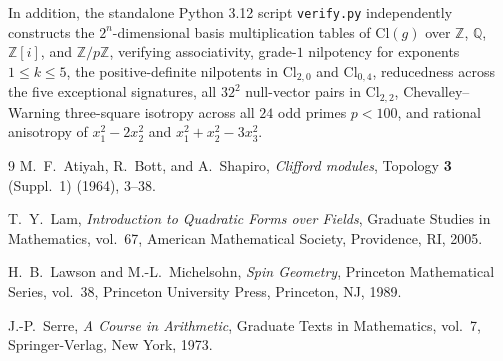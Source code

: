\documentclass[11pt]{article}
\theoremstyle{definition}
\newcommand{\Cl}{\mathrm{Cl}}
\newcommand{\Q}{\mathbb{Q}}
\newcommand{\Z}{\mathbb{Z}}
\begin{document}
In addition, the standalone Python 3.12 script \texttt{verify.py} independently constructs
the $2^n$-dimensional basis multiplication tables of $\Cl(g)$ over $\Z$, $\Q$, $\Z[i]$, and
$\Z/p\Z$, verifying associativity, grade-$1$ nilpotency for exponents $1 \le k \le 5$, the
positive-definite nilpotents in $\Cl_{2,0}$ and $\Cl_{0,4}$, reducedness across the five
exceptional signatures, all $32^2$ null-vector pairs in $\Cl_{2,2}$, Chevalley--Warning
three-square isotropy across all $24$ odd primes $p < 100$, and rational anisotropy of
$x_1^2 - 2x_2^2$ and $x_1^2 + x_2^2 - 3x_3^2$.

\begin{thebibliography}{9}
M.~F.~Atiyah, R.~Bott, and A.~Shapiro,
\emph{Clifford modules}, Topology \textbf{3} (Suppl.~1) (1964), 3--38.

T.~Y.~Lam,
\emph{Introduction to Quadratic Forms over Fields},
Graduate Studies in Mathematics, vol.~67, American Mathematical Society, Providence, RI, 2005.

H.~B.~Lawson and M.-L.~Michelsohn,
\emph{Spin Geometry},
Princeton Mathematical Series, vol.~38, Princeton University Press, Princeton, NJ, 1989.

J.-P.~Serre,
\emph{A Course in Arithmetic},
Graduate Texts in Mathematics, vol.~7, Springer-Verlag, New York, 1973.
\end{thebibliography}
\end{document}
